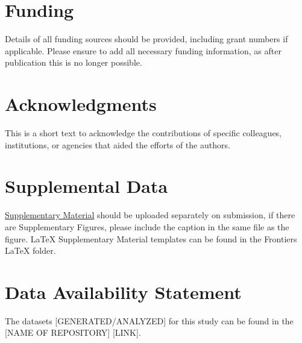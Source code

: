 \documentclass[utf8]{frontiersSCNS} %
\begin{document}
\section*{Funding}
Details of all funding sources should be provided, including grant numbers if applicable. Please ensure to add all necessary funding information, as after publication this is no longer possible.

\section*{Acknowledgments}
This is a short text to acknowledge the contributions of specific colleagues, institutions, or agencies that aided the efforts of the authors.

\section*{Supplemental Data}
 \href{http://home.frontiersin.org/about/author-guidelines#SupplementaryMaterial}{Supplementary Material} should be uploaded separately on submission, if there are Supplementary Figures, please include the caption in the same file as the figure. LaTeX Supplementary Material templates can be found in the Frontiers LaTeX folder.

\section*{Data Availability Statement}
The datasets [GENERATED/ANALYZED] for this study can be found in the [NAME OF REPOSITORY] [LINK].




\end{document}
